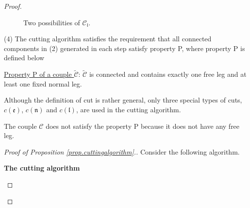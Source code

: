 \begin{proof}
\begin{prop}
\begin{figure}[H]
{
    }
        \caption{Two possibilities of $\mathcal{C}_\mathfrak{l}$.}
        \label{fig.2possibilities}
    \end{figure}
    
(4) The cutting algorithm satisfies the requirement that all connected components in (2) generated in each step satisfy property P, where property P is defined below

\underline{Property P of a couple $\widetilde{\mathcal{C}}$}: $\widetilde{\mathcal{C}}$ is connected and contains exactly one free leg and at least one fixed normal leg.



\end{prop}

\begin{rem}
Although the definition of cut is rather general, only three special types of cuts, $c(\mathfrak{e})$, $c(\mathfrak{n})$ and $c(\mathfrak{l})$, are used in the cutting algorithm.
\end{rem}

\begin{rem}
The couple $\mathcal{C}$ does not satisfy the property P because it does not have any free leg.
\end{rem}

\begin{proof}[Proof of Proposition \ref{prop.cuttingalgorithm}.] Consider the following algorithm.

\medskip


\begin{mdframed}

\centerline{\textbf{The cutting algorithm}}

\medskip 


\end{mdframed}
\end{proof}
\end{proof}
